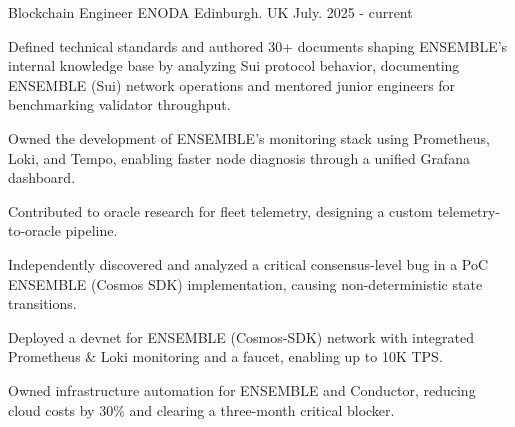 

\begin{cventries}

  \cventry
    {Blockchain Engineer} %
    {ENODA} %
    {Edinburgh. UK} %
    {July. 2025 - current} %
    {
        \begin{cvitems}
            \item {Defined technical standards and authored 30+ documents shaping ENSEMBLE’s internal knowledge base by analyzing Sui protocol behavior, documenting ENSEMBLE (Sui) network operations and mentored junior engineers for benchmarking validator throughput.}
            \item {Owned the development of ENSEMBLE’s monitoring stack using Prometheus, Loki, and Tempo, enabling faster node diagnosis through a unified Grafana dashboard.}
            \item {Contributed to oracle research for fleet telemetry, designing a custom telemetry-to-oracle pipeline.}
            \item {Independently discovered and analyzed a critical consensus-level bug in a PoC ENSEMBLE (Cosmos SDK) implementation, causing non-deterministic state transitions.}
            \item {Deployed a devnet for ENSEMBLE (Cosmos-SDK) network with integrated Prometheus \& Loki monitoring and a faucet, enabling up to 10K TPS.}
            \item {Owned infrastructure automation for ENSEMBLE and Conductor, reducing cloud costs by 30\% and clearing a three-month critical blocker.}
        \end{cvitems}
    }


\end{cventries}
